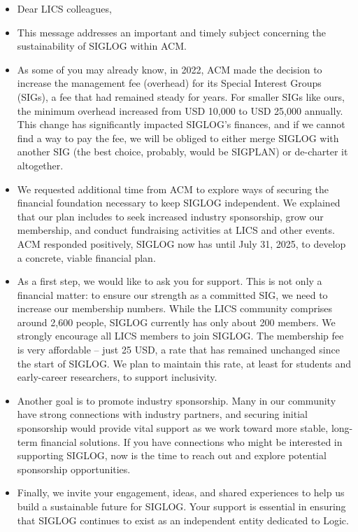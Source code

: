 \documentclass[prodmode,acmtecs]{acmsmall} %
\begin{document}
\begin{itemize}\item  Dear LICS colleagues, 
 
\item  This message addresses an important and timely subject concerning the sustainability of SIGLOG within ACM. 
 
\item  As some of you may already know, in 2022, ACM made the decision to increase the management fee (overhead) for its Special Interest Groups (SIGs), a fee that had remained steady for years. For smaller SIGs like ours, the minimum overhead increased from USD 10,000 to USD 25,000 annually. This change has significantly impacted SIGLOG's finances, and if we cannot find a way to pay the fee, we will be obliged to either merge SIGLOG with another SIG (the best choice, probably, would be SIGPLAN) or de-charter it altogether.  
 
\item  We requested additional time from ACM to explore ways of securing the financial foundation necessary to keep SIGLOG independent. We explained that our plan includes to seek increased industry sponsorship, grow our membership, and conduct fundraising activities at LICS and other events. ACM responded positively, SIGLOG now has until July 31, 2025, to develop a concrete, viable financial plan. 
 
\item  As a first step, we would like to ask you for support. This is not only a financial matter: to ensure our strength as a committed SIG, we need to increase our membership numbers. While the LICS community comprises around 2,600 people, SIGLOG currently has only about 200 members. We strongly encourage all LICS members to join SIGLOG. The membership fee is very affordable -- just 25 USD, a rate that has remained unchanged since the start of SIGLOG. We plan to maintain this rate, at least for students and early-career researchers, to support inclusivity. 
 
\item  Another goal is to promote industry sponsorship. Many in our community have strong connections with industry partners, and securing initial sponsorship would provide vital support as we work toward more stable, long-term financial solutions. If you have connections who might be interested in supporting SIGLOG, now is the time to reach out and explore potential sponsorship opportunities. 
 
\item  Finally, we invite your engagement, ideas, and shared experiences to help us build a sustainable future for SIGLOG. Your support is essential in ensuring that SIGLOG continues to exist as an independent entity dedicated to Logic. 
 

\end{itemize}
\end{document}
